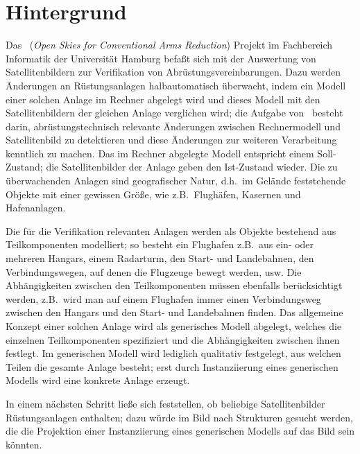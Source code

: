 \section{Hintergrund}
%
Das \oscar\ ({\em Open Skies for Conventional Arms Reduction\/})
Projekt im Fachbereich Informatik der Universit\"{a}t Hamburg befa\ss{}t
sich mit der Auswertung von Satellitenbildern zur Verifikation von
Abr\"{u}stungsvereinbarungen. Dazu werden \"{A}nderungen an R\"{u}stungsanlagen
halbautomatisch \"{u}berwacht, indem ein Modell einer solchen Anlage im
Rechner abgelegt wird und dieses Modell mit den Satellitenbildern der
gleichen Anlage verglichen wird; die Aufgabe von \oscar\ besteht
darin, abr\"{u}stungstechnisch relevante \"{A}nderungen zwischen
Rechnermodell und Satellitenbild zu detektieren und diese \"{A}nderungen
zur weiteren Verarbeitung kenntlich zu machen. Das im Rechner
abgelegte Modell entspricht einem Soll-Zustand; die Satellitenbilder
der Anlage geben den Ist-Zustand wieder. Die zu \"{u}berwachenden Anlagen
sind geografischer Natur, d.h.\ im Gel\"{a}nde feststehende Objekte mit
einer gewissen Gr\"{o}\ss{}e, wie z.B.\ Flugh\"{a}fen, Kasernen und
Hafenanlagen.
%
\par{}Die f\"{u}r die Verifikation relevanten Anlagen
werden als Objekte bestehend aus Teil\-kom\-po\-nen\-ten modelliert;
so besteht ein Flughafen z.B.\ aus ein- oder mehreren Hangars, einem
Radarturm, den Start- und Landebahnen, den Verbindungswegen, auf denen
die Flugzeuge bewegt werden, usw.  Die Ab\-h\"{a}n\-gig\-kei\-ten
zwischen den Teilkomponenten m\"{u}ssen ebenfalls be\-r\"{u}ck\-sich\-tigt
werden, z.B.\ wird man auf einem Flughafen immer einen Verbindungsweg
zwischen den Hangars und den Start- und Landebahnen finden. Das
allgemeine Konzept einer solchen Anlage wird als generisches Modell
abgelegt, welches die einzelnen Teilkomponenten spezifiziert und die
Ab\-h\"{a}n\-gig\-kei\-ten zwischen ihnen festlegt.  Im generischen
Modell wird lediglich qualitativ festgelegt, aus welchen Teilen die
gesamte Anlage besteht; erst durch Instanziierung eines generischen
Modells wird eine konkrete Anlage erzeugt.
%
\par{}In einem n\"{a}chsten Schritt lie\ss{}e sich feststellen, ob beliebige
Satellitenbilder R\"{u}\-stungs\-an\-la\-gen enthalten; dazu w\"{u}rde im
Bild nach Strukturen gesucht werden, die die Projektion einer
Instanziierung eines generischen Modells auf das Bild sein k\"{o}nnten.
